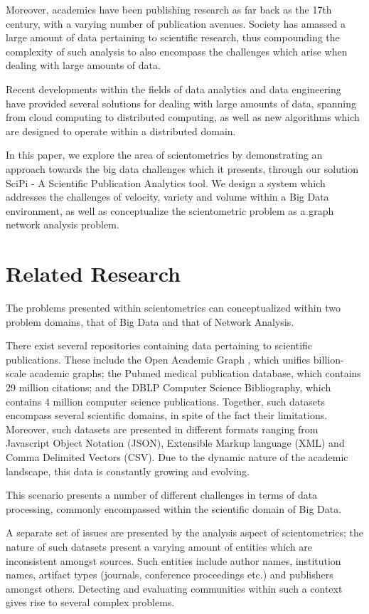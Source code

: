 \documentclass[10pt,journal,final,a4paper]{IEEEtran}
\begin{document}
Moreover, academics have been publishing research as far back as the 17th century, with a varying number of publication avenues\cite{sm_time}. Society has amassed a large amount of data pertaining to scientific research, thus compounding the complexity of such analysis to also encompass the challenges which arise when dealing with large amounts of data.

Recent developments within the fields of data analytics and data engineering have provided several solutions for dealing with large amounts of data, spanning from cloud computing to distributed computing, as well as new algorithms which are designed to operate within a distributed domain.

In this paper, we explore the area of scientometrics by demonstrating an approach towards the big data challenges which it presents, through our solution SciPi - A Scientific Publication Analytics tool.  We design a system which addresses the challenges of velocity, variety and volume within a Big Data environment, as well as conceptualize the scientometric problem as a graph network analysis problem.

\section{Related Research}
The problems presented within scientometrics can conceptualized within two problem domains, that of Big Data and that of Network Analysis.

There exist several repositories containing data pertaining to scientific publications. These include the Open Academic Graph \cite{oag}, which unifies billion-scale academic graphs; the Pubmed medical publication database\cite{pubmed}, which contains 29 million citations; and the DBLP Computer Science Bibliography\cite{dblp}, which contains 4 million computer science publications. Together, such datasets encompass several scientific domains, in spite of the fact their limitations. Moreover, such datasets are presented in different formats ranging from Javascript Object Notation (JSON), Extensible Markup language (XML) and Comma Delimited Vectors (CSV). Due to the dynamic nature of the academic landscape, this data is constantly growing and evolving.

This scenario presents a number of different challenges in terms of data processing, commonly encompassed within the scientific domain of Big Data.

A separate set of issues are presented by the analysis aspect of scientometrics; the nature of such datasets present a varying amount of entities which are inconsistent amongst sources. Such entities include author names, institution names, artifact types (journals, conference proceedings etc.) and publishers amongst others. Detecting and evaluating communities within such a context gives rise to several complex problems.
\end{document}
